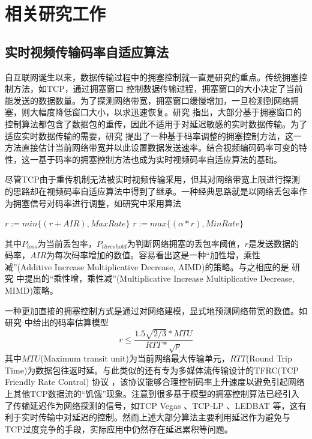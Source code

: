 \chapter{相关研究工作}
\label{chap:related}

\section{实时视频传输码率自适应算法}
自互联网诞生以来，数据传输过程中的拥塞控制就一直是研究的重点。传统拥塞控制方法，如TCP，通过拥塞窗口 \cite{jacobson1988congestion} 控制数据传输过程，拥塞窗口的大小决定了当前能发送的数据数量。为了探测网络带宽，拥塞窗口缓慢增加，一旦检测到网络拥塞，则大幅度降低窗口大小，以求迅速恢复。研究 \cite{wu2000end}指出，大部分基于拥塞窗口的控制算法都包含了数据包的重传，因此不适用于对延迟敏感的实时数据传输。为了适应实时数据传输的需要，研究 \cite{turletti1996videoconferencing} 提出了一种基于码率调整的拥塞控制方法，这一方法直接估计当前网络带宽并以此设置数据发送速率。结合视频编码码率可变的特性，这一基于码率的拥塞控制方法也成为实时视频码率自适应算法的基础。

尽管TCP由于重传机制无法被实时视频传输采用，但其对网络带宽上限进行探测的思路却在视频码率自适应算法中得到了继承。一种经典思路就是以网络丢包率作为拥塞信号对码率进行调整，如研究\cite{wu2000end}中采用算法
\begin{algorithmic}
    \State $r := min\{(r+AIR), MaxRate \} $
\Else
    \State $r := max\{(\alpha * r), MinRate \} $
\EndIf
\end{algorithmic}
其中$P_{loss}$为当前丢包率，$P_{threshold}$为判断网络拥塞的丢包率阈值，$r$是发送数据的码率，$AIR$为每次码率增加的数值。容易看出这是一种“加性增，乘性减”(Additive Increase Multiplicative Decrease, AIMD)的策略。与之相应的是 研究 \cite{turletti1996videoconferencing} 中提出的“乘性增，乘性减”(Multiplicative Increase Multiplicative Decrease, MIMD)策略。

一种更加直接的拥塞控制方式是通过对网络建模，显式地预测网络带宽的数值。如研究 \cite{floyd1999promoting} 中给出的码率估算模型
\begin{equation}
  r \le \frac{1.5\sqrt{2/3} * MTU}{RTT * \sqrt{p}}
\end{equation}
其中$MTU$(Maximum transit unit)为当前网络最大传输单元，$RTT$(Round Trip Time)为数据包往返时延。与此类似的还有专为多媒体流传输设计的TFRC(TCP Friendly Rate Control) 协议 \cite{handley2003tcp}，该协议能够合理控制码率上升速度以避免引起网络上其他TCP数据流的``饥饿''现象。注意到很多基于模型的拥塞控制算法已经引入了传输延迟作为网络探测的信号，如TCP Vegas \cite{brakmo1995tcp} 、TCP-LP \cite{kuzmanovic2003tcp}、LEDBAT \cite{shalunov2012low}等，这有利于实时传输中对延迟的控制。然而上述大部分算法主要利用延迟作为避免与TCP过度竞争的手段，实际应用中仍然存在延迟累积等问题。

